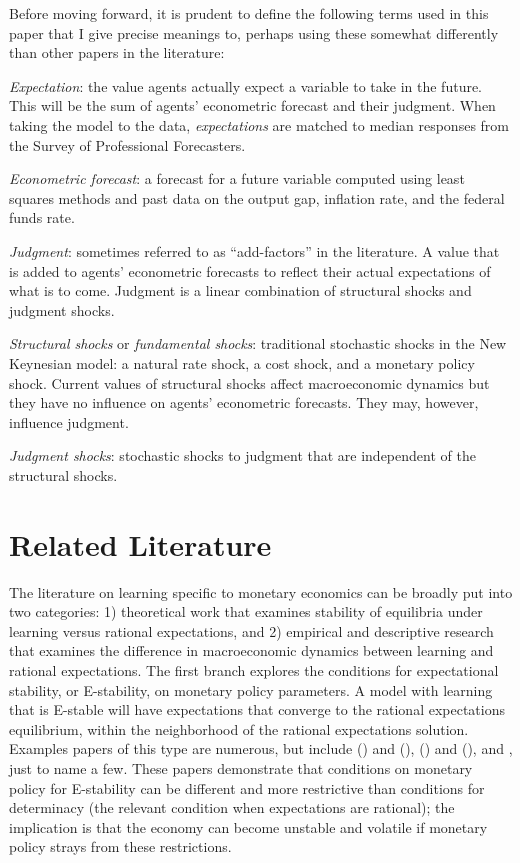 \documentclass[12pt]{article}
\newcommand{\bd}{\begin{description}}
\newcommand{\ed}{\end{description}}
\newcommand{\citee}[1]{\citet{#1}}
\begin{document}
Before moving forward, it is prudent to define the following terms used in this paper that I give precise meanings to, perhaps using these somewhat differently than other papers in the literature:
\bd
\item \textit{Expectation}: the value agents actually expect a variable to take in the future.  This will be the sum of agents' econometric forecast and their judgment.  When taking the model to the data, \textit{expectations} are matched to median responses from the Survey of Professional Forecasters.
\item \textit{Econometric forecast}: a forecast for a future variable computed using least squares methods and past data on the output gap, inflation rate, and the federal funds rate.
\item \textit{Judgment}: sometimes referred to as ``add-factors'' in the literature.  A value that is added to agents' econometric forecasts to reflect their actual expectations of what is to come.  Judgment is a linear combination of structural shocks and judgment shocks.  
\item \textit{Structural shocks} or \textit{fundamental shocks}: traditional stochastic shocks in the New Keynesian model: a natural rate shock, a cost shock, and a monetary policy shock.  Current values of structural shocks affect macroeconomic dynamics but they have no influence on agents' econometric forecasts.  They may, however, influence judgment.
\item \textit{Judgment shocks}: stochastic shocks to judgment that are independent of the structural shocks.
\ed

\section{Related Literature}

The literature on learning specific to monetary economics can be broadly put into two categories: 1) theoretical work that examines stability of equilibria under learning versus rational expectations, and 2) empirical and descriptive research that examines the difference in macroeconomic dynamics between learning and rational expectations.  The first branch explores the conditions for expectational stability, or E-stability, on monetary policy parameters.  A model with learning that is E-stable will have expectations that converge to the rational expectations equilibrium, within the neighborhood of the rational expectations solution.  Examples papers of this type are numerous, but include \citeauthor*{bullardmitra2002} (\citeyear{bullardmitra2002}) and (\citeyear{bullardmitra2007}), \citeauthor*{eh2003} (\citeyear{eh2003b}) and (\citeyear{eh2003}), and \citee{preston2005}, just to name a few.  These papers demonstrate that conditions on monetary policy for E-stability can be different and more restrictive than conditions for determinacy (the relevant condition when expectations are rational); the implication is that the economy can become unstable and volatile if monetary policy strays from these restrictions.
\end{document}

